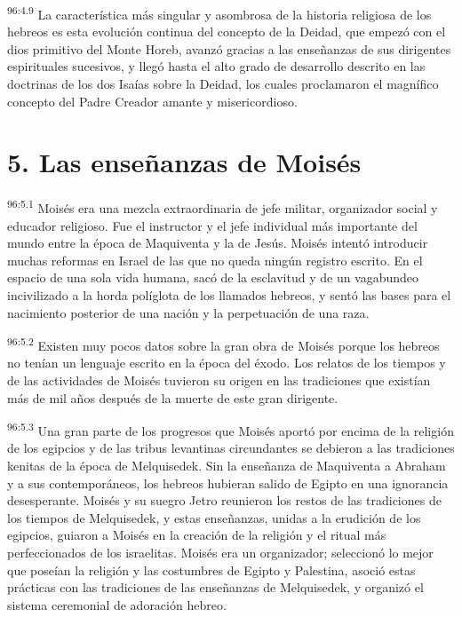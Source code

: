 \par
\textsuperscript{96:4.9} La característica más singular y asombrosa de la historia religiosa de los hebreos es esta evolución continua del concepto de la Deidad, que empezó con el dios primitivo del Monte Horeb, avanzó gracias a las enseñanzas de sus dirigentes espirituales sucesivos, y llegó hasta el alto grado de desarrollo descrito en las doctrinas de los dos Isaías sobre la Deidad, los cuales proclamaron el magnífico concepto del Padre Creador amante y misericordioso.

\section*{5. Las enseñanzas de Moisés}
\par
\textsuperscript{96:5.1} Moisés era una mezcla extraordinaria de jefe militar, organizador social y educador religioso. Fue el instructor y el jefe individual más importante del mundo entre la época de Maquiventa y la de Jesús. Moisés intentó introducir muchas reformas en Israel de las que no queda ningún registro escrito. En el espacio de una sola vida humana, sacó de la esclavitud y de un vagabundeo incivilizado a la horda políglota de los llamados hebreos, y sentó las bases para el nacimiento posterior de una nación y la perpetuación de una raza.

\par
\textsuperscript{96:5.2} Existen muy pocos datos sobre la gran obra de Moisés porque los hebreos no tenían un lenguaje escrito en la época del éxodo. Los relatos de los tiempos y de las actividades de Moisés tuvieron su origen en las tradiciones que existían más de mil años después de la muerte de este gran dirigente.

\par
\textsuperscript{96:5.3} Una gran parte de los progresos que Moisés aportó por encima de la religión de los egipcios y de las tribus levantinas circundantes se debieron a las tradiciones kenitas de la época de Melquisedek. Sin la enseñanza de Maquiventa a Abraham y a sus contemporáneos, los hebreos hubieran salido de Egipto en una ignorancia desesperante. Moisés y su suegro Jetro reunieron los restos de las tradiciones de los tiempos de Melquisedek, y estas enseñanzas, unidas a la erudición de los egipcios, guiaron a Moisés en la creación de la religión y el ritual más perfeccionados de los israelitas. Moisés era un organizador; seleccionó lo mejor que poseían la religión y las costumbres de Egipto y Palestina, asoció estas prácticas con las tradiciones de las enseñanzas de Melquisedek, y organizó el sistema ceremonial de adoración hebreo.

